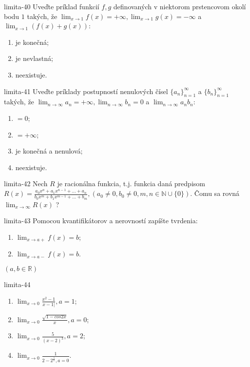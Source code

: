 \begin{defproblem}{limita-40}
Uveďte príklad funkcií $f,g$ definovaných v niektorom prstencovom okolí bodu $1$ takých, že $\lim_{x \rightarrow 1} f(x)=+\infty,\lim_{x \rightarrow 1} g(x)=-\infty$ a $\lim_{x \rightarrow 1} (f(x)+g(x))$:
\begin{enumerate}
\item je konečná;
\item je nevlastná;
\item neexistuje.
\end{enumerate}
\end{defproblem}

\begin{defproblem}{limita-41}
Uveďte príklady postupností nenulových čísel ${\{a_n\}}_{n=1}^\infty$ a ${\{b_n\}}_{n=1}^\infty$ takých, že $\lim_{n \rightarrow \infty} a_n=+\infty,\lim_{n \rightarrow \infty} b_n=0$ a $\lim_{n \rightarrow \infty} a_nb_n$:
\begin{enumerate}
\item $=0$;
\item $=+\infty$;
\item je konečná a nenulová;
\item neexistuje.
\end{enumerate}
\end{defproblem}

\begin{defproblem}{limita-42}
Nech $R$ je racionálna funkcia, t.j. funkcia daná predpisom $R(x)=\frac{a_0x^n+a_1x^{n-1}+...+a_n}{b_0x^m+b_1x^{m-1}+...+b_m},(a_0 \neq 0, b_0 \neq 0,m,n \in \mathbb{N} \cup \{ 0\})$. Čomu sa rovná $\lim_{x \rightarrow \infty} R(x)$ ?
\end{defproblem}

\begin{defproblem}{limita-43}
Pomocou kvantifikátorov a nerovností zapíšte tvrdenia:
\begin{enumerate}
\item $\lim_{x \rightarrow a+} f(x)=b$;
\item $\lim_{x \rightarrow a-} f(x)=b$.
\end{enumerate}
$(a,b \in \mathbb{R})$
\end{defproblem}

\begin{defproblem}{limita-44}
\begin{multicols}{2}
\begin{enumerate}
    \item $\lim_{{x \rightarrow 0}} \frac{x^2-1}{x-1|},a=1$;
    \item $\lim_{{x \rightarrow 0}} \frac{\sqrt{1-cos 2x}}{x},a=0$;
    \item $\lim_{{x \rightarrow 0}} \frac{5}{(x-2)^3},a=2$;
    \item $\lim_{{x \rightarrow 0}} \frac{1}{2-2^{\frac{1}{x}},a=0}$.
\end{enumerate}
\end{multicols}
\end{defproblem}

